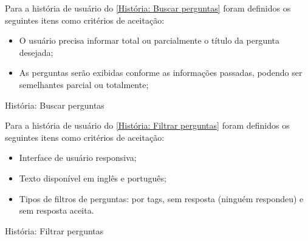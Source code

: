 Para a história de usuário do \autoref{História: Buscar perguntas} foram definidos os seguintes itens como critérios de aceitação:

\begin{itemize}
\item O usuário precisa informar total ou parcialmente o título da pergunta desejada;
\item As perguntas serão exibidas conforme as informações passadas, podendo ser semelhantes parcial ou totalmente;
\end{itemize}

\def\arraystretch{2}
\begin{quadro}[htb]
\centering
\ABNTEXfontereduzida
\caption[História: Buscar perguntas]{História: Buscar perguntas}
\label{História: Buscar perguntas}
\end{quadro}
\FloatBarrier 

Para a história de usuário do \autoref{História: Filtrar perguntas} foram definidos os seguintes itens como critérios de aceitação:

\begin{itemize}
\item Interface de usuário responsiva;
\item Texto disponível em inglês e português;
\item Tipos de filtros de perguntas: por tags, sem resposta (ninguém respondeu) e sem resposta aceita.
\end{itemize}

\def\arraystretch{2}
\begin{quadro}[htb]
\centering
\ABNTEXfontereduzida
\caption[História: Filtrar perguntas]{História: Filtrar perguntas}
\label{História: Filtrar perguntas}
\end{quadro}
\FloatBarrier 

